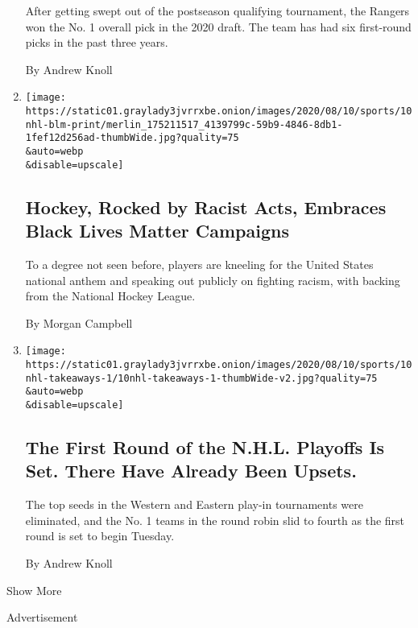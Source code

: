 \begin{enumerate}
  After getting swept out of the postseason qualifying tournament, the
  Rangers won the No. 1 overall pick in the 2020 draft. The team has had
  six first-round picks in the past three years.

  By Andrew Knoll
\item
  \href{/2020/08/10/sports/hockey/nhl-racism-protests-george-floyd.html}{}

  \texttt{[image: https://static01.graylady3jvrrxbe.onion/images/2020/08/10/sports/10nhl-blm-print/merlin\_175211517\_4139799c-59b9-4846-8db1-1fef12d256ad-thumbWide.jpg?quality=75\\\&auto=webp\\\&disable=upscale]}

  \hypertarget{hockey-rocked-by-racist-acts-embraces-black-lives-matter-campaigns}{%
  \subsection{Hockey, Rocked by Racist Acts, Embraces Black Lives Matter
  Campaigns}\label{hockey-rocked-by-racist-acts-embraces-black-lives-matter-campaigns}}

  To a degree not seen before, players are kneeling for the United
  States national anthem and speaking out publicly on fighting racism,
  with backing from the National Hockey League.

  By Morgan Campbell
\item
  \href{/2020/08/10/sports/hockey/nhl-playoffs-round-standings.html}{}

  \texttt{[image: https://static01.graylady3jvrrxbe.onion/images/2020/08/10/sports/10nhl-takeaways-1/10nhl-takeaways-1-thumbWide-v2.jpg?quality=75\\\&auto=webp\\\&disable=upscale]}

  \hypertarget{the-first-round-of-the-nhl-playoffs-is-set-there-have-already-been-upsets}{%
  \subsection{The First Round of the N.H.L. Playoffs Is Set. There Have
  Already Been
  Upsets.}\label{the-first-round-of-the-nhl-playoffs-is-set-there-have-already-been-upsets}}

  The top seeds in the Western and Eastern play-in tournaments were
  eliminated, and the No. 1 teams in the round robin slid to fourth as
  the first round is set to begin Tuesday.

  By Andrew Knoll
\end{enumerate}

Show More

Advertisement

